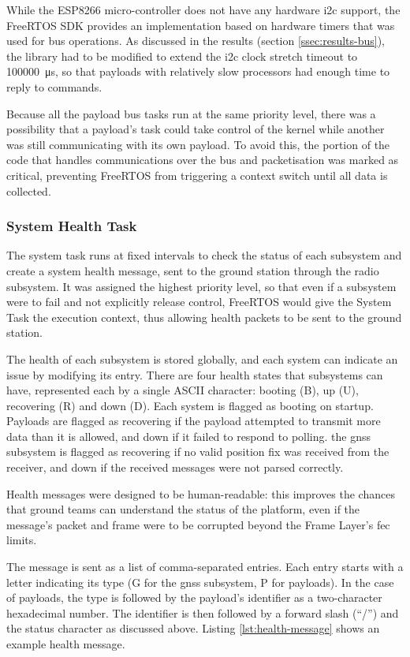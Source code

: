 While the ESP8266 micro-controller does not have any hardware \acrshort{i2c}
support, the FreeRTOS SDK provides an implementation based on hardware timers
that was used for bus operations. As discussed in the results (section
\ref{ssec:results-bus}), the library had to be modified to extend the
\acrshort{i2c} clock stretch timeout to \SI{100000}{\micro\second}, so that
payloads with relatively slow processors had enough time to reply to commands.

Because all the payload bus tasks run at the same priority level, there was a
possibility that a payload's task could take control of the kernel while another
was still communicating with its own payload. To avoid this, the portion of the
code that handles communications over the bus and packetisation was marked
as critical, preventing FreeRTOS from triggering a context switch until all data
is collected.

\subsubsection{System Health Task}

The system task runs at fixed intervals to check the status of each subsystem
and create a system health message, sent to the ground station through the
radio subsystem. It was assigned the highest priority level, so that even if a
subsystem were to fail and not explicitly release control, FreeRTOS would give
the System Task the execution context, thus allowing health packets to be sent
to the ground station.

The health of each subsystem is stored globally, and each system can indicate
an issue by modifying its entry. There are four health states that subsystems
can have, represented each by a single ASCII character: booting (B), up (U),
recovering (R) and down (D). Each system is flagged as booting on startup.
Payloads are flagged as recovering if the payload attempted to transmit more
data than it is allowed, and down if it failed to respond to polling. the
\acrshort{gnss} subsystem is flagged as recovering if no valid position fix was
received from the receiver, and down if the received messages were not parsed
correctly.

Health messages were designed to be human-readable: this improves the chances
that ground teams can understand the status of the platform, even if the
message's packet and frame were to be corrupted beyond the Frame Layer's
\acrshort{fec} limits.

The message is sent as a list of comma-separated entries. Each entry starts
with a letter indicating its type (G for the \acrshort{gnss} subsystem, P for
payloads). In the case of payloads, the type is followed by the payload's
identifier as a two-character hexadecimal number. The identifier is then
followed by a forward slash (``/'') and the status character as discussed above.
Listing \ref{lst:health-message} shows an example health message.

